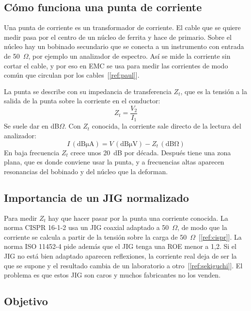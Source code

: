 \documentclass[11pt,a4paper]{article}
\begin{document}
\subsection{Cómo funciona una punta de corriente}

Una punta de corriente es un transformador de corriente. El cable que se quiere medir pasa por el centro de un núcleo de ferrita y hace de primario. Sobre el núcleo hay un bobinado secundario que se conecta a un instrumento con entrada de 50~$\Omega$, por ejemplo un analizador de espectro. Así se mide la corriente sin cortar el cable, y por eso en EMC se usa para medir las corrientes de modo común que circulan por los cables~[\ref{ref:paul}].

La punta se describe con su impedancia de transferencia $Z_t$, que es la tensión a la salida de la punta sobre la corriente en el conductor:
\begin{equation}
  Z_t = \frac{V_2}{I_1}
\end{equation}
Se suele dar en dB$\Omega$. Con $Z_t$ conocida, la corriente sale directo de la lectura del analizador:
\begin{equation}
  I\,(\mathrm{dB\mu A}) = V\,(\mathrm{dB\mu V}) - Z_t\,(\mathrm{dB\Omega})
\end{equation}
En baja frecuencia $Z_t$ crece unos 20~dB por década. Después tiene una zona plana, que es donde conviene usar la punta, y a frecuencias altas aparecen resonancias del bobinado y del núcleo que la deforman.

\subsection{Importancia de un JIG normalizado}

Para medir $Z_t$ hay que hacer pasar por la punta una corriente conocida. La norma CISPR 16-1-2 usa un JIG coaxial adaptado a 50~$\Omega$, de modo que la corriente se calcula a partir de la tensión sobre la carga de 50~$\Omega$~[\ref{ref:cispr}]. La norma ISO 11452-4 pide además que el JIG tenga una ROE menor a 1,2. Si el JIG no está bien adaptado aparecen reflexiones, la corriente real deja de ser la que se supone y el resultado cambia de un laboratorio a otro~[\ref{ref:sekiguchi}]. El problema es que estos JIG son caros y muchos fabricantes no los venden.

\subsection{Objetivo}
\end{document}
